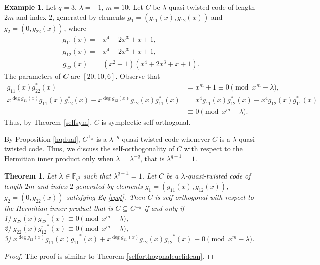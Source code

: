 \documentclass[12 pt]{extarticle}
\numberwithin{equation}{section}
\newtheorem{theorem}{Theorem}[section]
\theoremstyle{definition}
\newtheorem{example}{Example}[section]
\begin{document}
\begin{example}
 Let $q=3$, $\lambda=-1$, $m=10$. Let $C$ be $\lambda$-quasi-twisted code of length $2m$ and index $2$, generated by elements $g_1=(g_{11}(x),g_{12}(x))$ and $g_2=(0,g_{22}(x))$, where
\begin{equation*}
    \begin{split}
       g_{11}(x)=&x^4 + 2x^3 + x + 1,\\
       g_{12}(x)=&x^4 + 2x^3 + x + 1,\\
       g_{22}(x)=&(x^2+1)(x^4 + 2x^3 + x + 1). 
    \end{split}
\end{equation*}
The parameters of $C$ are $[20,10,6]$.
Observe that 
\begin{align*}
   g_{11}(x)g_{22}^*(x)&=x^m+1\equiv 0\pmod{x^m-\lambda},\\
   x^{\deg g_{11}(x)} g_{11}(x)g_{12}^*(x)-x^{\deg g_{12}(x)}g_{12}(x)g_{11}^*(x)&=x^4g_{11}(x)g_{12}^*(x)-x^4g_{12}(x)g_{11}^*(x)\\
   &\equiv 0\pmod{x^m-\lambda}. 
\end{align*}
Thus, by Theorem \ref{selfsym}, $C$ is symplectic self-orthogonal. 
\end{example}


By Proposition \ref{hqdual}, $C^{\perp_h}$ is a $\lambda^{-q}$-quasi-twisted code whenever $C$ is a $\lambda$-quasi-twisted code. Thus, we discuss the self-orthogonality of $C$ with respect to the Hermitian inner product only when $\lambda=\lambda^{-q}$, that is $\lambda^{q+1}= 1$.

 \begin{theorem}\label{hermistiansleforthogonal}
   Let $\lambda\in \mathbb{F}_{q^2}$ such that $\lambda^{q+1}=1$. Let $C$ be a $\lambda$-quasi-twisted code of length $2m$ and index $2$ generated by elements $g_1=(g_{11}(x),g_{12}(x))$, $g_2=(0,g_{22}(x))$ satisfying Eq \ref{eqqt}. Then $C$ is self-orthogonal with respect to the Hermitian inner product that is $C\subseteq C^{\perp_h}$ if and only if \\
1) $g_{22}(x)\overline{g_{22}}^*(x)\equiv 0\pmod{x^m-\lambda}$, \\
   2)     $g_{22}(x)\overline{g_{12}}^*(x)\equiv 0\pmod{x^m-\lambda}$,\\
     3) $x^{\deg g_{12}(x)} g_{11}(x)\overline{g_{11}}^*(x)+x^{\deg g_{11}(x)}g_{12}(x)\overline{g_{12}}^*(x)\equiv 0\pmod{x^m-\lambda}$. 
\end{theorem}

\begin{proof}
 The proof is similar to Theorem \ref{selforthogonaleuclidean}.
\end{proof}
\end{document}
